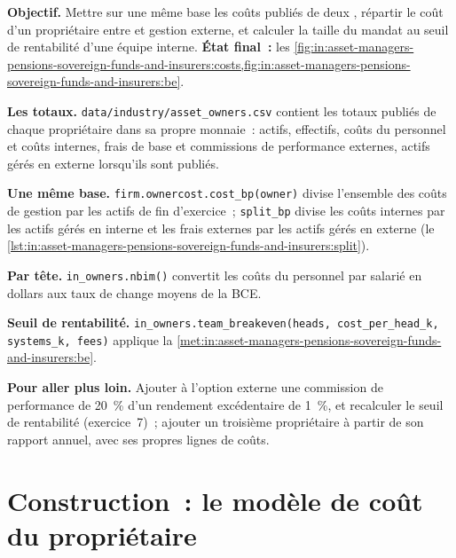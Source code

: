\begin{tutorial}
\textbf{Objectif.} Mettre sur une même base les coûts publiés de deux , répartir le coût d'un propriétaire entre  et
gestion externe, et calculer la taille du mandat au seuil de rentabilité d'une équipe interne. \textbf{État final~:}
les \cref{fig:in:asset-managers-pensions-sovereign-funds-and-insurers:costs,fig:in:asset-managers-pensions-sovereign-funds-and-insurers:be}.
\begin{tutsteps}
\item \textbf{Les totaux.} \texttt{data/industry/asset\_owners.csv} contient les totaux publiés de chaque propriétaire dans sa propre
monnaie~: actifs, effectifs, coûts du personnel et coûts internes, frais de base et commissions de performance externes, actifs gérés en externe
lorsqu'ils sont publiés.
\item \textbf{Une même base.} \texttt{firm.ownercost.cost\_bp(owner)} divise l'ensemble des coûts de gestion par les actifs de fin d'exercice~;
\texttt{split\_bp} divise les coûts internes par les actifs gérés en interne et les frais externes par les actifs gérés en externe
(le \cref{lst:in:asset-managers-pensions-sovereign-funds-and-insurers:split}).
\label{lst:in:asset-managers-pensions-sovereign-funds-and-insurers:split}
\item \textbf{Par tête.} \texttt{in\_owners.nbim()} convertit les coûts du personnel par salarié en dollars aux taux de change moyens
de la BCE.
\item \textbf{Seuil de rentabilité.} \texttt{in\_owners.team\_breakeven(heads, cost\_per\_head\_k, systems\_k, fees)} applique
la \cref{met:in:asset-managers-pensions-sovereign-funds-and-insurers:be}.
\end{tutsteps}
\end{tutorial}

\textbf{Pour aller plus loin.} Ajouter à l'option externe une commission de performance de 20~\% d'un rendement excédentaire de 1~\%, et recalculer
le seuil de rentabilité (exercice~7)~; ajouter un troisième propriétaire à partir de son rapport annuel, avec ses propres lignes de coûts.

\section{Construction~: le modèle de coût du propriétaire}\label{bld:in:asset-managers-pensions-sovereign-funds-and-insurers:ownercost}

